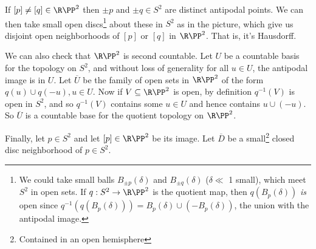 \begin{example}
\begin{center}
        
            \end{center}
        

    If $[p] \neq [q] \in \R\PP^2$ then $\pm p$ and $\pm q \in S^2$ are distinct antipodal points. We can then take small open discs\footnote{We could take small balls $B_{\pm p}(\delta)$ and $B_{\pm q}(\delta)$ ($\delta \ll$ 1 small), which meet $S^2$ in open sets. If $q: S^2 \rightarrow \R\PP^2$ is the quotient map, then $q(B_{p}(\delta))$ \emph{is} open since $q^{-1}(q(B_{p}(\delta))) = B_{p}(\delta) \cup (-B_{p}(\delta))$, the union with the antipodal image.} about these in $S^2$ as in the picture, which give us disjoint open neighborhoods of $[p]$ or $[q]$ in $\R \PP^2$. That is, it's Hausdorff.

    We can also check that $\R\PP^2$ is second countable. Let $U$ be a countable basis for the topology on $S^2$, and without loss of generality for all $u \in U$, the antipodal image is in $U$.
    Let $\overline{U}$ be the family of open sets in $\R\PP^2$ of the form $q(u) \cup q(-u), u \in U$.
    Now if $V \subseteq \R\PP^2$ is open, by definition $q^{-1}(V)$ is open in $S^2$, and so $q^{-1}(V)$ contains some $u \in U$ and hence contains $u \cup (-u)$. So $\overline{U}$ is a countable base for the quotient topology on $\R\PP^2$.

    Finally, let $p \in S^2$ and let $[p] \in \R\PP^2$ be its image.
    Let $\overline{D}$ be a small\footnote{Contained in an open hemisphere} closed disc neighborhood of $p \in S^2$.

    \begin{center}
        

  


\end{center}
\end{example}
